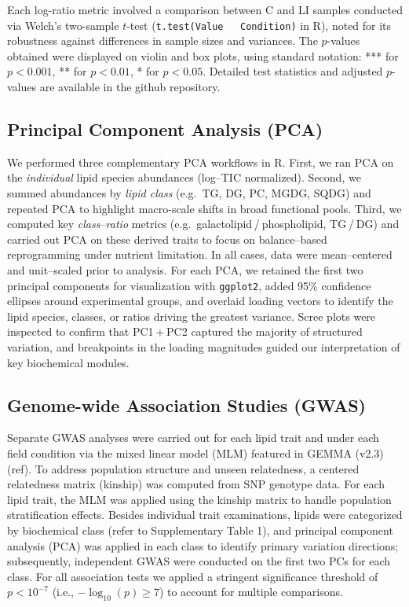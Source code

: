 \documentclass[10pt,letterpaper]{article}
\begin{document}
Each log-ratio metric involved a comparison between C and LI samples conducted via Welch's two-sample \(t\)-test (\texttt{t.test(Value ~ Condition)} in \textsf{R}), noted for its robustness against differences in sample sizes and variances. The \(p\)-values obtained were displayed on violin and box plots, using standard notation: *** for \(p<0.001\), ** for \(p<0.01\), * for \(p<0.05\). Detailed test statistics and adjusted \(p\)-values are available in the github repository.


\subsection*{Principal Component Analysis (PCA)}  
We performed three complementary PCA workflows in R.  First, we ran PCA on the \emph{individual} lipid species abundances (log–TIC normalized).  Second, we summed abundances by \emph{lipid class} (e.g.\ TG, DG, PC, MGDG, SQDG) and repeated PCA to highlight macro-scale shifts in broad functional pools.  Third, we computed key \emph{class–ratio} metrics (e.g.\ galactolipid / phospholipid, TG / DG) and carried out PCA on these derived traits to focus on balance–based reprogramming under nutrient limitation. In all cases, data were mean–centered and unit–scaled prior to analysis.  For each PCA, we retained the first two principal components for visualization with \texttt{ggplot2}, added 95\% confidence ellipses around experimental groups, and overlaid loading vectors to identify the lipid species, classes, or ratios driving the greatest variance.  Scree plots were inspected to confirm that PC1 + PC2 captured the majority of structured variation, and breakpoints in the loading magnitudes guided our interpretation of key biochemical modules.  


\subsection*{Genome-wide Association Studies (GWAS)} 
Separate GWAS analyses were carried out for each lipid trait and under each field condition via the mixed linear model (MLM) featured in GEMMA (v2.3) (ref). To address population structure and unseen relatedness, a centered relatedness matrix (kinship) was computed from SNP genotype data. For each lipid trait, the MLM was applied using the kinship matrix to handle population stratification effects. Besides individual trait examinations, lipids were categorized by biochemical class (refer to Supplementary Table 1), and principal component analysis (PCA) was applied in each class to identify primary variation directions; subsequently, independent GWAS were conducted on the first two PCs for each class. For all association tests we applied a stringent significance threshold of \(p < 10^{-7}\) (i.e., \(-\log_{10}(p) \geq 7\)) to account for multiple comparisons.
\end{document}
